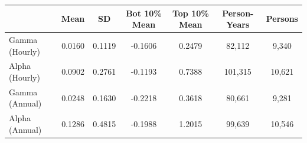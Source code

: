 \begin{tabular}{lcccccc}
\hline\hline
 & Mean & SD & Bot 10\% Mean & Top 10\% Mean & Person-Years & Persons \\
\hline
Gamma (Hourly)&0.0160&0.1119&-0.1606&0.2479&82,112&9,340\\
Alpha (Hourly)&0.0902&0.2761&-0.1193&0.7388&101,315&10,621\\
Gamma (Annual)&0.0248&0.1630&-0.2218&0.3618&80,661&9,281\\
Alpha (Annual)&0.1286&0.4815&-0.1988&1.2015&99,639&10,546\\
\hline\hline
\end{tabular}
